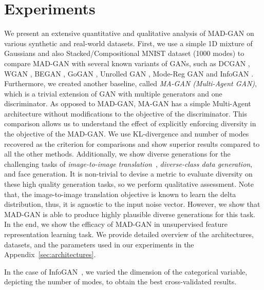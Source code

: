 \section{Experiments}
We present an extensive quantitative and qualitative analysis of MAD-GAN on various synthetic and real-world datasets. First, we use a simple 1D mixture of Gaussians and also Stacked/Compositional MNIST dataset (1000 modes) to compare MAD-GAN with several known variants of GANs, such as DCGAN \cite{radford2015unsupervised}, WGAN \cite{arjovsky2017wasserstein}, BEGAN \cite{berthelot2017began}, GoGAN \cite{juefei2017gang}, Unrolled GAN \cite{metz2017unrolledGAN}, Mode-Reg GAN \cite{che2016mode} and InfoGAN \cite{chen2016infogan}. Furthermore, we created another baseline, called {\em MA-GAN (Multi-Agent GAN)}, which is a trivial extension of GAN with multiple generators and one discriminator. As opposed to MAD-GAN, MA-GAN has a simple Multi-Agent architecture without modifications to the objective of the discriminator. This comparison allows us to understand the effect of explicitly enforcing diversity in the objective of the MAD-GAN. We use KL-divergence \cite{kullback1951information} and number of modes recovered \cite{che2016mode} as the criterion for comparisons and show superior results compared to all the other methods. Additionally, we show diverse generations for the challenging tasks of {\em image-to-image translation}~\cite{isola2016image2image}, {\em diverse-class data generation}, and face generation. It is non-trivial to devise a metric to evaluate diversity on these high quality generation tasks, so we perform qualitative assessment. Note that, the image-to-image translation objective is known to learn the delta distribution, thus, it is agnostic to the input noise vector. However, we show that MAD-GAN is able to produce highly plausible diverse generations for this task. In the end, we show the efficacy of MAD-GAN in unsupervised feature representation learning task. We provide detailed overview of the architectures, datasets, and the parameters used in our experiments in the Appendix~\ref{sec:architectures}.

In the case of InfoGAN~\cite{chen2016infogan}, we varied the dimension of the categorical variable, depicting the number of modes, to obtain the best cross-validated results.


